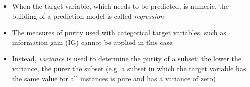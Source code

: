   
  \begin{itemize}  
  \item When the target variable, which needs to be predicted, is numeric, the building of a prediction model is called \emph{regression}
  \item The measures of purity used with categorical target variables, such as information gain (IG) cannot be applied in this case
  \item Instead, \emph{variance} is used to determine the purity of a subset: the lower the variance, the purer the subset (e.g. a subset in which the target variable has the same value for all instances is pure and has a variance of zero)
  \end{itemize}
  \newpage


